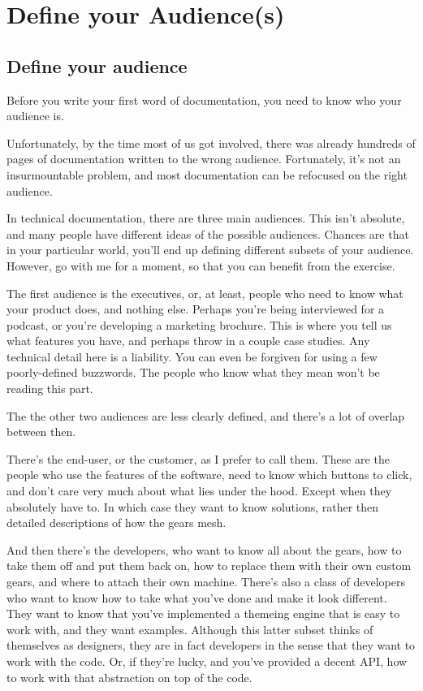 \chapter{Define your Audience(s)}

\section{Define your audience}

Before you write your first word of documentation, you need to know who
your audience is.

Unfortunately, by the time most of us got involved, there was already
hundreds of pages of documentation written to the wrong audience.
Fortunately, it's not an insurmountable problem, and most documentation
can be refocused on the right audience.

In technical documentation, there are three main audiences. This isn't
absolute, and many people have different ideas of the possible
audiences. Chances are that in your particular world, you'll end up
defining different subsets of your audience. However, go with me for a
moment, so that you can benefit from the exercise.

The first audience is the executives, or, at least, people who need to
know what your product does, and nothing else. Perhaps you're being
interviewed for a podcast, or you're developing a marketing brochure.
This is where you tell us what features you have, and perhaps throw in a
couple case studies. Any technical detail here is a liability. You can
even be forgiven for using a few poorly-defined buzzwords. The people
who know what they mean won't be reading this part.

The the other two audiences are less clearly defined, and there's a lot
of overlap between then.

There's the end-user, or the customer, as I prefer to call them. These
are the people who use the features of the software, need to know which
buttons to click, and don't care very much about what lies under the
hood. Except when they absolutely have to. In which case they want to
know solutions, rather then detailed descriptions of how the gears mesh.

And then there's the developers, who want to know all about the gears,
how to take them off and put them back on, how to replace them with
their own custom gears, and where to attach their own machine. There's
also a class of developers who want to know how to take what you've done
and make it look different. They want to know that you've implemented a
themeing engine that is easy to work with, and they want examples.
Although this latter subset thinks of themselves as designers, they are
in fact developers in the sense that they want to work with the code.
Or, if they're lucky, and you've provided a decent API, how to work with
that abstraction on top of the code.

